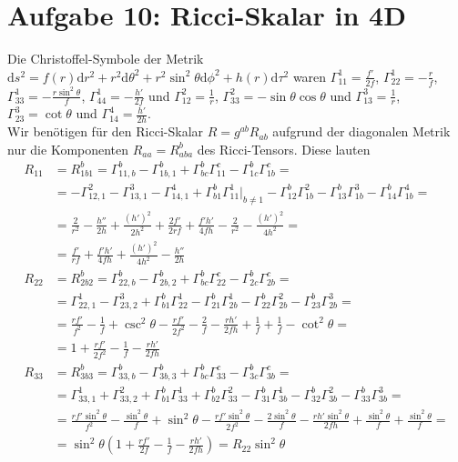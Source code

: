 \documentclass[a4paper,12pt]{article}
\newcommand{\kla}{}
\newcommand{\tecxt}{}
\begin{document}
\section*{Aufgabe 10: Ricci-Skalar in 4D}
Die Christoffel-Symbole der Metrik $\tecxt\text{d}s^2=f(r)\tecxt\text{d}r^2+r^2\tecxt\text{d}\theta^2+r^2\sin^2\theta\tecxt\text{d}\phi^2+h(r)\tecxt\text{d}\tau^2$ waren $\Gamma^1_{11}=\frac{f'}{2f}$, $\Gamma^1_{22}=-\frac{r}{f}$, $\Gamma^1_{33}=-\frac{r\sin^2\theta}{f}$, $\Gamma^1_{44}=-\frac{h'}{2f}$ und $\Gamma^2_{12}=\frac{1}{r}$, $\Gamma^2_{33}=-\sin\theta\cos\theta$ und $\Gamma^3_{13}=\frac{1}{r}$, $\Gamma^3_{23}=\cot\theta$ und $\Gamma^4_{14}=\frac{h'}{2h}$.\\
Wir benötigen für den Ricci-Skalar $R=g^{ab}R_{ab}$ aufgrund der diagonalen Metrik nur die Komponenten $R_{aa}=R^b_{aba}$ des Ricci-Tensors. Diese lauten
\begin{align*}
R_{11}&=R^b_{1b1}=\Gamma^b_{11,b}-\Gamma^b_{1b,1}+\Gamma^b_{bc}\Gamma^c_{11}-\Gamma^b_{1c}\Gamma^c_{1b}=\\
&=-\Gamma^2_{12,1}-\Gamma^3_{13,1}-\Gamma^4_{14,1}+\Gamma^b_{b1}\Gamma^1_{11}\big\vert_{b\neq 1}-\Gamma^b_{12}\Gamma^2_{1b}-\Gamma^b_{13}\Gamma^3_{1b}-\Gamma^b_{14}\Gamma^4_{1b}=\\
&=\frac{2}{r^2}-\frac{h''}{2h}+\frac{(h')^2}{2h^2}+\frac{2f'}{2rf}+\frac{f'h'}{4fh}-\frac{2}{r^2}-\frac{(h')^2}{4h^2}=\\
&=\frac{f'}{rf}+\frac{f'h'}{4fh}+\frac{(h')^2}{4h^2}-\frac{h''}{2h}\\
R_{22}&=R^b_{2b2}=\Gamma^b_{22,b}-\Gamma^b_{2b,2}+\Gamma^b_{bc}\Gamma^c_{22}-\Gamma^b_{2c}\Gamma^c_{2b}=\\
&=\Gamma^1_{22,1}-\Gamma^3_{23,2}+\Gamma^b_{b1}\Gamma^1_{22}-\Gamma^b_{21}\Gamma^1_{2b}-\Gamma^b_{22}\Gamma^2_{2b}-\Gamma^b_{23}\Gamma^3_{2b}=\\
&=\frac{rf'}{f^2}-\frac{1}{f}+\csc^2\theta-\frac{rf'}{2f^2}-\frac{2}{f}-\frac{rh'}{2fh}+\frac{1}{f}+\frac{1}{f}-\cot^2\theta=\\
&=1+\frac{rf'}{2f^2}-\frac{1}{f}-\frac{rh'}{2fh}\\
R_{33}&=R^b_{3b3}=\Gamma^b_{33,b}-\Gamma^b_{3b,3}+\Gamma^b_{bc}\Gamma^c_{33}-\Gamma^b_{3c}\Gamma^c_{3b}=\\
&=\Gamma^1_{33,1}+\Gamma^2_{33,2}+\Gamma^b_{b1}\Gamma^1_{33}+\Gamma^b_{b2}\Gamma^2_{33}-\Gamma^b_{31}\Gamma^1_{3b}-\Gamma^b_{32}\Gamma^2_{3b}-\Gamma^b_{33}\Gamma^3_{3b}=\\
&=\frac{rf'\sin^2\theta}{f^2}-\frac{\sin^2\theta}{f}+\sin^2\theta-\frac{rf'\sin^2\theta}{2f^2}-\frac{2\sin^2\theta}{f}-\frac{rh'\sin^2\theta}{2fh}+\frac{\sin^2\theta}{f}+\frac{\sin^2\theta}{f}=\\
&=\sin^2\theta\kla\left( {1+\frac{rf'}{2f}-\frac{1}{f}-\frac{rh'}{2fh}} \right)=R_{22}\sin^2\theta
\end{align*}\,\newpage
\end{document}
